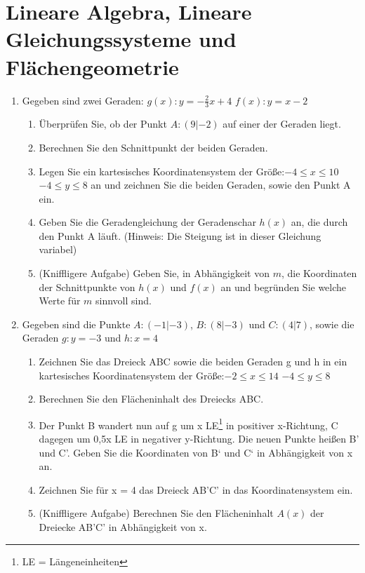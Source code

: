 \documentclass{scrartcl}
\begin{document}
	\section{Lineare Algebra, Lineare Gleichungssysteme und Flächengeometrie}
		
	\begin{enumerate}
		\item Gegeben sind zwei Geraden: \quad $g(x): y = - \frac{2}{3}  x + 4$ \quad $f(x): y = x-2$
			\begin{enumerate}
				\item Überprüfen Sie, ob der Punkt $A: (9|-2)$ auf einer der Geraden liegt.
				\item Berechnen Sie den Schnittpunkt der beiden Geraden.
				\item Legen Sie ein kartesisches Koordinatensystem der Größe:\quad $ -4 \leq x \leq 10 $ \quad $-4 \leq y \leq 8$  an und zeichnen Sie die beiden Geraden, sowie den Punkt A ein.
				\item Geben Sie die Geradengleichung der Geradenschar $h(x)$ an, die durch den Punkt A läuft. (Hinweis: Die Steigung ist in dieser Gleichung variabel)
				\item (Kniffligere Aufgabe) Geben Sie, in Abhängigkeit von $m$, die Koordinaten der Schnittpunkte von $h(x)$ und $f(x)$ an und begründen Sie welche Werte für $m$ sinnvoll sind. \\
			\end{enumerate}
			
			
		\item Gegeben sind die Punkte $A:(-1|-3)$,\; $B:(8|-3)$ und $C:(4|7)$, sowie die Geraden $g: y = -3$ und $h: x = 4$
			\begin{enumerate}
				\item Zeichnen Sie das Dreieck ABC sowie die beiden Geraden g und h in ein kartesisches Koordinatensystem der Größe:\quad $ -2\leq x \leq 14 $ \quad $-4 \leq y \leq 8$ 
				\item Berechnen Sie den Flächeninhalt des Dreiecks ABC.
				\item Der Punkt B wandert nun auf g um x LE\footnote{LE = Längeneinheiten} in positiver x-Richtung, C dagegen um 0,5x LE in negativer y-Richtung. Die neuen Punkte heißen B' und C'. Geben Sie die Koordinaten von B‘ und C‘ in Abhängigkeit von x an.
				\item Zeichnen Sie für x = 4 das Dreieck AB'C' in das Koordinatensystem ein.
				\item (Kniffligere Aufgabe) Berechnen Sie den Flächeninhalt $A(x)$ der Dreiecke AB'C' in Abhängigkeit von x.
				 \\
			\end{enumerate}
			

\end{enumerate}
\end{document}
